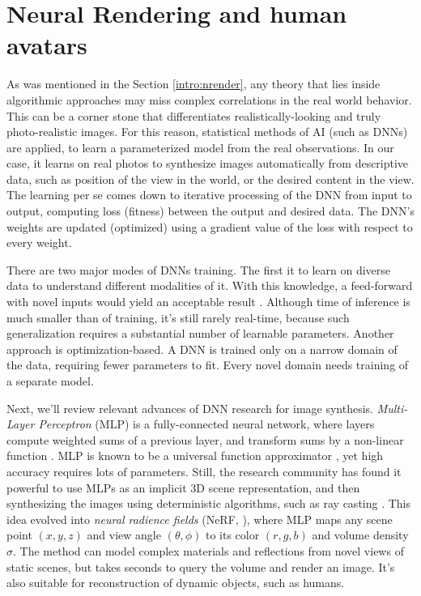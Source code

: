 \section{Neural Rendering and human avatars}\label{lit:nrender}

As was mentioned in the Section \ref{intro:nrender}, any theory that lies inside algorithmic approaches may miss complex correlations in the real world behavior. This can be a corner stone that differentiates realistically-looking and truly photo-realistic images. For this reason, statistical methods of AI (such as DNNs) are applied, to learn a parameterized model from the real observations. In our case, it learns on real photos to synthesize images automatically from descriptive data, such as position of the view in the world, or the desired content in the view. The learning per se comes down to iterative processing of the DNN from input to output, computing loss (fitness) between the output and desired data. The DNN's weights are updated (optimized) using a gradient value of the loss with respect to every weight.

There are two major modes of DNNs training. The first it to learn on diverse data to understand different modalities of it. With this knowledge, a feed-forward with novel inputs would yield an acceptable result \cite{dnn:gan14, dnn:gaugan19, dnn:stylegan-v1-19}. Although time of inference is much smaller than of training, it's still rarely real-time, because such generalization requires a substantial number of learnable parameters. Another approach is optimization-based. A DNN is trained only on a narrow domain of the data, requiring fewer parameters to fit. Every novel domain needs training of a separate model. 

Next, we'll review relevant advances of DNN research for image synthesis. \textit{Multi-Layer Perceptron} (MLP) is a fully-connected neural network, where layers compute weighted sums of a previous layer, and transform sums by a non-linear function \cite{aux:activation18}. MLP is known to be a universal function approximator \cite{dnn:mlp89}, yet high accuracy requires lots of parameters. Still, the research community has found it powerful to use MLPs as an implicit 3D scene representation, and then synthesizing the images using deterministic algorithms, such as ray casting \cite{dnn:scene-repr19}. This idea evolved into \textit{neural radience fields} (NeRF, \cite{dnn:nerf20}), where MLP maps any scene point $(x, y, z)$ and view angle $(\theta, \phi)$ to its color $(r, g, b)$ and volume density $\sigma$. The method can model complex materials and reflections from novel views of static scenes, but takes seconds to query the volume and render an image. It's also suitable for reconstruction of dynamic objects, such as humans\cite{dnn:phorhum22}.

